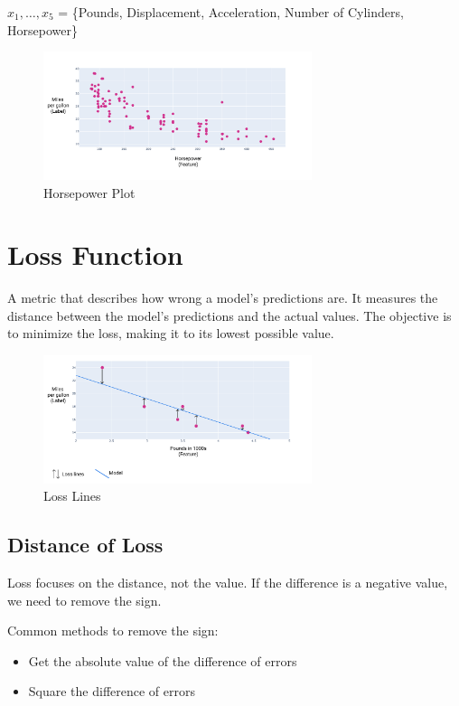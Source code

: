 \documentclass[a4paper,12pt]{article}
\begin{document}
\noindent $x_1, \dots, x_5$ = \{Pounds, Displacement, Acceleration, Number of Cylinders, Horsepower\}

\begin{figure}[H]
    \centering
    \includegraphics[width=0.7\textwidth]{../Images/Linear-Regression/horsepower-plot.png}
    \caption{Horsepower Plot}
    \label{fig:horsepower-plot}
\end{figure}

\section{Loss Function}
A metric that describes how wrong a model's predictions are. It measures the distance between the model's predictions and the actual values. The objective is to minimize the loss, making it to its lowest possible value.

\begin{figure}[H]
    \centering
    \includegraphics[width=0.7\textwidth]{../Images/Linear-Regression/loss-lines.png}
    \caption{Loss Lines}
    \label{fig:loss-lines}
\end{figure}

\subsection{Distance of Loss}
Loss focuses on the distance, not the value. If the difference is a negative value, we need to remove the sign.

\noindent Common methods to remove the sign: 
\begin{itemize}
    \item Get the absolute value of the difference of errors
    \item Square the difference of errors
\end{itemize}
\end{document}
